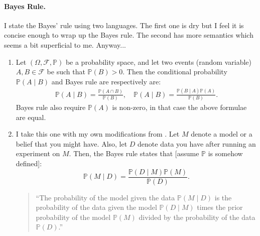 \documentclass[a4paper]{article}
\theoremstyle{definition}
\newcommand{\cF}{\mathcal{F}}
\renewcommand{\P}{\mathbb{P}}
\begin{document}
\paragraph{Bayes Rule.} I state the Bayes' rule using two languages. The first one is dry but I feel it is concise enough to wrap up the Bayes rule. The second has more semantics which seems a bit superficial to me. Anyway...
\begin{enumerate}
    \item Let $(\Omega, \cF, \P)$ be a probability space, and let two events (random variable) $A, B \in \cF$ be such that $\P(B) >0$. Then the conditional probability $\P(A \mid B)$ and Bayes rule are respectively are:
    \begin{align*}
        \P(A \mid B) = \frac{\P(A \cap B)}{\P(B)}, \quad
        \P(A \mid B) = \frac{\P(B \mid A)\P(A)}{\P(B)}.
    \end{align*}
    Bayes rule also require $\P(A)$ is non-zero, in that case the above formulae are equal.

    \item I take this one with my own modifications from \citet{ghahramani2011bayes}. Let $M$ denote a model or a belief that you might have. Also, let $D$ denote data you have after running an experiment on $M$. Then, the Bayes rule states that [assume $\P$ is somehow defined]:
    \begin{equation*}
        \P(M \mid D) = \frac{\P(D \mid M)\P(M)}{\P(D)}.
    \end{equation*}
    \begin{quote}
        ``The probability of the model given the data $\P(M \mid D)$ is the probability of the data given the model $\P(D \mid M)$ times the prior probability of the model $\P(M)$ divided by the probability of the data $\P(D)$.''~\citep{ghahramani2011bayes}
    \end{quote}
\end{enumerate}


%
\end{document}
